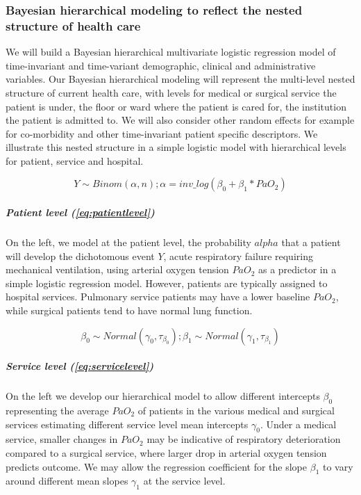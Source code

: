 \documentclass[11pt,notitlepage]{article}
\begin{document}
\subsubsection*{Bayesian hierarchical modeling to reflect the nested structure of health care}   
We will build a Bayesian hierarchical multivariate logistic regression model of time-invariant and time-variant demographic, clinical and administrative variables. Our Bayesian hierarchical modeling will represent the multi-level nested structure of current health care, with levels for medical or surgical service the patient is under, the floor or ward where the patient is cared for, the institution the patient is admitted to. We will also consider other random effects for example for co-morbidity and other time-invariant patient specific descriptors. We illustrate this nested structure in a simple logistic model with hierarchical levels for patient, service and hospital. 

\begin{figure}
\vspace{-20pt}
 \begin{equation} \label{eq:patientlevel}
 Y \sim Binom (\alpha, n); \alpha = inv\_log (\beta_{0} +\beta_{1} * PaO_2)
 \end{equation}
\vspace{-25pt}
\end{figure}

\subparagraph*{Patient level (\ref{eq:patientlevel})}
On the left, we model at the patient level, the probability $alpha$ that a patient will develop the dichotomous event $Y$, acute respiratory failure requiring mechanical ventilation, using arterial oxygen tension $PaO_{2}$ as a predictor in a simple logistic regression model. However, patients are typically assigned to hospital services. Pulmonary service patients may have a lower baseline $PaO_2$, while surgical patients tend to have normal lung function. 

\begin{figure}
\vspace{-10pt}
\begin{equation} \label{eq:servicelevel}
 \beta_{0} \sim Normal (\gamma_0 , \tau_{\beta_0}); \beta_{1} \sim Normal (\gamma_1, \tau_{\beta_1})
\end{equation}
\vspace{-25pt}
\end{figure}

\subparagraph*{Service level (\ref{eq:servicelevel})}
On the left we develop our hierarchical model to allow different intercepts $\beta_{0}$ representing the average $PaO_2$ of patients in the various medical and surgical services estimating different service level mean intercepts $\gamma_0$. Under a medical service, smaller changes in $PaO_2$ may be indicative of respiratory deterioration compared to a surgical service, where larger drop in arterial oxygen tension predicts outcome. We may allow the regression coefficient for the slope $\beta_{1}$ to vary around different mean slopes $\gamma_1$ at the service level. 
\end{document}
